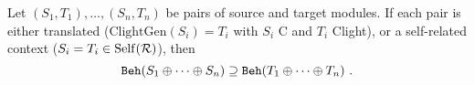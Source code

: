 \begin{lemma} \label{thm:results-clightgen}
  Let $(S_1,T_1), \ldots, (S_n,T_n)$ be pairs of source and target modules.
  If each pair is either translated (\ie $\textrm{ClightGen}(S_i) = T_i$ with $S_i$ \textrm{\cc{} C} and $T_i$ \textrm{Clight}), or a self-related context (\ie $S_i = T_i \in \mathrm{Self}(\mathcal{R})$), then
  \[
    \mathtt{Beh}({S_1 \oplus \cdots \oplus S_n}) \supseteq \mathtt{Beh}({T_1 \oplus \cdots \oplus T_n})~.
  \]
\end{lemma}
%
%

